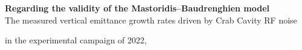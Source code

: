 \textbf{Regarding the validity of the Mastoridis--Baudrenghien model}\\
The measured vertical emittance growth rates driven by Crab Cavity RF noise 


in the experimental campaign of 2022, 







